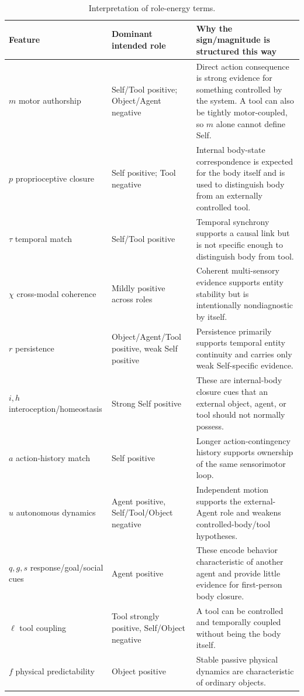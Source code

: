 \documentclass[10pt,journal,onecolumn]{IEEEtran}
\begin{document}
\begin{table}[h]
\caption{Interpretation of role-energy terms.}
\label{tab:roleinterpret}
\centering
\scriptsize
\begin{tabularx}{\textwidth}{@{}p{}p{}X@{}}
\toprule
Feature & Dominant intended role & Why the sign/magnitude is structured this way \\
\midrule
$m$ motor authorship & Self/Tool positive; Object/Agent negative & Direct action consequence is strong evidence for something controlled by the system. A tool can also be tightly motor-coupled, so $m$ alone cannot define Self. \\
$p$ proprioceptive closure & Self positive; Tool negative & Internal body-state correspondence is expected for the body itself and is used to distinguish body from an externally controlled tool. \\
$\tau$ temporal match & Self/Tool positive & Temporal synchrony supports a causal link but is not specific enough to distinguish body from tool. \\
$\chi$ cross-modal coherence & Mildly positive across roles & Coherent multi-sensory evidence supports entity stability but is intentionally nondiagnostic by itself. \\
$r$ persistence & Object/Agent/Tool positive, weak Self positive & Persistence primarily supports temporal entity continuity and carries only weak Self-specific evidence. \\
$i,h$ interoception/homeostasis & Strong Self positive & These are internal-body closure cues that an external object, agent, or tool should not normally possess. \\
$a$ action-history match & Self positive & Longer action-contingency history supports ownership of the same sensorimotor loop. \\
$u$ autonomous dynamics & Agent positive, Self/Tool/Object negative & Independent motion supports the external-Agent role and weakens controlled-body/tool hypotheses. \\
$q,g,s$ response/goal/social cues & Agent positive & These encode behavior characteristic of another agent and provide little evidence for first-person body closure. \\
$\ell$ tool coupling & Tool strongly positive, Self/Object negative & A tool can be controlled and temporally coupled without being the body itself. \\
$f$ physical predictability & Object positive & Stable passive physical dynamics are characteristic of ordinary objects. \\
\bottomrule
\end{tabularx}
\end{table}
\end{document}
